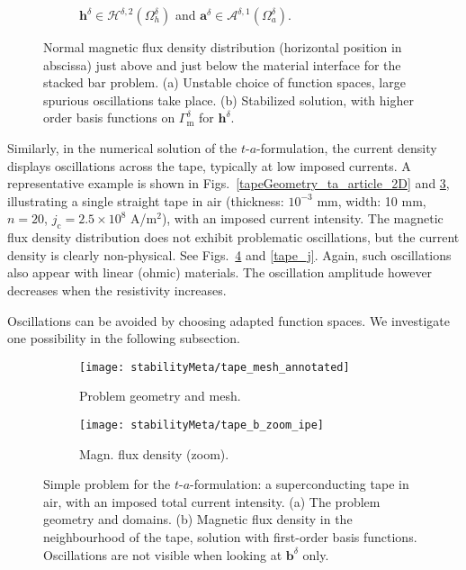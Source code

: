 \documentclass[journal]{IEEEtran}
\renewcommand{\vec}[1]{\boldsymbol{#1}} %
\newcommand{\jc}{j_{\text{c}}}
\newcommand{\tafOnly}{$t$-$a$-formulation}
\newcommand{\Oad}{\Omega_a^\delta}
\newcommand{\Ohd}{\Omega_h^\delta}
\newcommand{\Gmd}{\Gamma_\text{m}^\delta}
\newcommand{\aspdone}{\mathcal{A}^{\delta,1}}
\newcommand{\hspdtwo}{\mathcal{H}^{\delta,2}}
\newcommand{\ad}{\vec a^{\delta}}
\newcommand{\bd}{\vec b^{\delta}}
\newcommand{\hd}{\vec h^{\delta}}
\begin{document}
\begin{figure}[h!]
\begin{subfigure}[b]{\linewidth}
%
	\vspace{-0.3cm}
		\caption{$\hd\in \hspdtwo(\Ohd)$ and $\ad\in \aspdone(\Oad)$.}
		\label{bar_ha_stability_stable}	
      \end{subfigure}
        \caption{Normal magnetic flux density distribution (horizontal position in abscissa) just above and just below the material interface for the stacked bar problem. (a) Unstable choice of function spaces, large spurious oscillations take place. (b) Stabilized solution, with higher order basis functions on $\Gmd$ for $\hd$.}
        \label{bar_ha_stability}
\end{figure}

Similarly, in the numerical solution of the \tafOnly, the current density displays oscillations across the tape, typically at low imposed currents. A representative example is shown in Figs.~\ref{tapeGeometry_ta_article_2D} and \ref{tape_mesh}, illustrating a single straight tape in air (thickness: $10^{-3}$ mm, width: 10 mm, $n=20$, $\jc=2.5\times 10^8$ A/m$^2$), with an imposed current intensity. The magnetic flux density distribution does not exhibit problematic oscillations, but the current density is clearly non-physical. See Figs.~\ref{tape_zoom} and \ref{tape_j}. Again, such oscillations also appear with linear (ohmic) materials. The oscillation amplitude however decreases when the resistivity increases.

Oscillations can be avoided by choosing adapted function spaces. We investigate one possibility in the following subsection.

\begin{figure}[h!]
\centering
            \begin{subfigure}[b]{0.49\linewidth}
            \centering
		\texttt{[image: stabilityMeta/tape\_mesh\_annotated]}
		\caption{Problem geometry and mesh.}
		\label{tape_mesh}
        \end{subfigure}
\begin{subfigure}[b]{0.49\linewidth}  
            \centering 
		\texttt{[image: stabilityMeta/tape\_b\_zoom\_ipe]}
		\caption{Magn. flux density (zoom).}
		\label{tape_zoom}	
      \end{subfigure}
        \caption{Simple problem for the \tafOnly: a superconducting tape in air, with an imposed total current intensity. (a) The problem geometry and domains. (b) Magnetic flux density in the neighbourhood of the tape, solution with first-order basis functions. Oscillations are not visible when looking at $\bd$ only.}
        \label{tape_b}
\end{figure}
\end{document}
